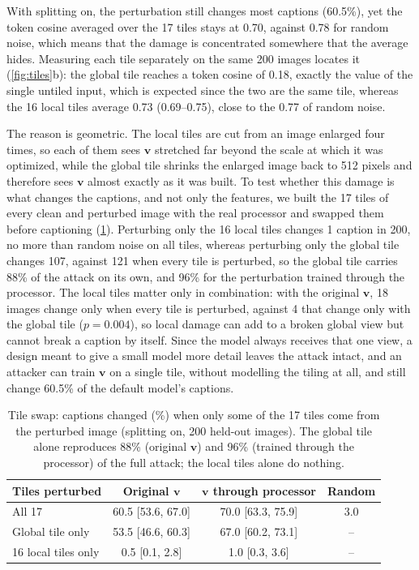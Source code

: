 \documentclass[10pt,twocolumn,letterpaper]{article}
\newcommand{\vv}{\boldsymbol{v}}
\begin{document}
With splitting on, the perturbation still changes most captions (60.5\%), yet the token cosine averaged over the 17 tiles stays at 0.70, against 0.78 for random noise, which means that the damage is concentrated somewhere that the average hides. Measuring each tile separately on the same 200 images locates it (\cref{fig:tiles}b): the global tile reaches a token cosine of 0.18, exactly the value of the single untiled input, which is expected since the two are the same tile, whereas the 16 local tiles average 0.73 (0.69--0.75), close to the 0.77 of random noise.

The reason is geometric. The local tiles are cut from an image enlarged four times, so each of them sees $\vv$ stretched far beyond the scale at which it was optimized, while the global tile shrinks the enlarged image back to 512 pixels and therefore sees $\vv$ almost exactly as it was built. To test whether this damage is what changes the captions, and not only the features, we built the 17 tiles of every clean and perturbed image with the real processor and swapped them before captioning (\cref{tab:swap}). Perturbing only the 16 local tiles changes 1 caption in 200, no more than random noise on all tiles, whereas perturbing only the global tile changes 107, against 121 when every tile is perturbed, so the global tile carries 88\% of the attack on its own, and 96\% for the perturbation trained through the processor. The local tiles matter only in combination: with the original $\vv$, 18 images change only when every tile is perturbed, against 4 that change only with the global tile ($p=0.004$), so local damage can add to a broken global view but cannot break a caption by itself. Since the model always receives that one view, a design meant to give a small model more detail leaves the attack intact, and an attacker can train $\vv$ on a single tile, without modelling the tiling at all, and still change 60.5\% of the default model's captions.

\begin{table}[t]
\centering
\small
\setlength{\tabcolsep}{3pt}
\begin{tabular}{@{}lccc@{}}
\toprule
Tiles perturbed & Original $\vv$ & $\vv$ through processor & Random \\
\midrule
All 17 & 60.5 {\scriptsize[53.6, 67.0]} & 70.0 {\scriptsize[63.3, 75.9]} & 3.0 \\
Global tile only & 53.5 {\scriptsize[46.6, 60.3]} & 67.0 {\scriptsize[60.2, 73.1]} & -- \\
16 local tiles only & 0.5 {\scriptsize[0.1, 2.8]} & 1.0 {\scriptsize[0.3, 3.6]} & -- \\
\bottomrule
\end{tabular}
\caption{Tile swap: captions changed (\%) when only some of the 17 tiles come from the perturbed image (splitting on, 200 held-out images). The global tile alone reproduces 88\% (original $\vv$) and 96\% (trained through the processor) of the full attack; the local tiles alone do nothing.}
\label{tab:swap}
\end{table}
\end{document}

